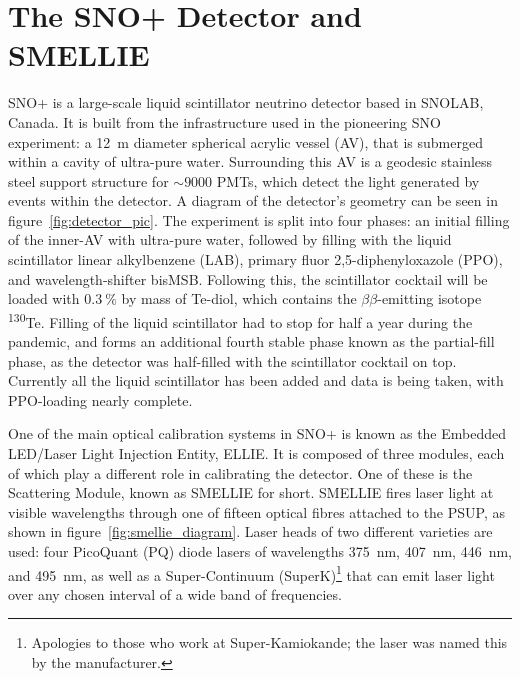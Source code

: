 \section{The SNO+ Detector and SMELLIE}\label{sect:detector}
SNO+ is a large-scale liquid scintillator neutrino detector based in SNOLAB, Canada. It is built from the infrastructure used in the pioneering SNO experiment: a \SI{12}{\metre} diameter spherical acrylic vessel (AV), that is submerged within a cavity of ultra-pure water. Surrounding this AV is a geodesic stainless steel support structure for $\sim\num{9000}$ PMTs, which detect the light generated by events within the detector. A diagram of the detector's geometry can be seen in figure~\ref{fig:detector_pic}. The experiment is split into four phases: an initial filling of the inner-AV with ultra-pure water, followed by filling with the liquid scintillator linear alkylbenzene (LAB), primary fluor 2,5-diphenyloxazole (PPO), and wavelength-shifter bisMSB. Following this, the scintillator cocktail will be loaded with $\SI{0.3}{\percent}$ by mass of Te-diol, which contains the $\beta\beta$-emitting isotope \textsuperscript{130}Te. Filling of the liquid scintillator had to stop for half a year during the pandemic, and forms an additional fourth stable phase known as the partial-fill phase, as the detector was half-filled with the scintillator cocktail on top. Currently all the liquid scintillator has been added and data is being taken, with PPO-loading nearly complete.

One of the main optical calibration systems in SNO+ is known as the Embedded LED/Laser Light Injection Entity, ELLIE. It is composed of three modules, each of which play a different role in calibrating the detector. One of these is the Scattering Module, known as SMELLIE for short. SMELLIE fires laser light at visible wavelengths through one of fifteen optical fibres attached to the PSUP, as shown in figure~\ref{fig:smellie_diagram}. Laser heads of two different varieties are used: four PicoQuant (PQ) diode lasers of wavelengths \SI{375}{\nano\metre}, \SI{407}{\nano\metre}, \SI{446}{\nano\metre}, and \SI{495}{\nano\metre}, as well as a Super-Continuum (SuperK)\footnote{Apologies to those who work at Super-Kamiokande; the laser was named this by the manufacturer.} that can emit laser light over any chosen interval of a wide band of frequencies.


